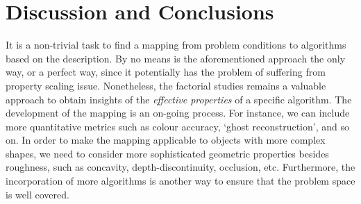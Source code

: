 \section{Discussion and Conclusions}
It is a non-trivial task to find a mapping from problem conditions to algorithms based on the description. By no means is the aforementioned approach the only way, or a perfect way, since it potentially has the problem of suffering from property scaling issue. Nonetheless, the factorial studies remains a valuable approach to obtain insights of the \textit{effective properties} of a specific algorithm. The development of the mapping is an on-going process. For instance, we can include more quantitative metrics such as colour accuracy, `ghost reconstruction', and so on. In order to make the mapping applicable to objects with more complex shapes, we need to consider more sophisticated geometric properties besides roughness, such as concavity, depth-discontinuity, occlusion, etc. Furthermore, the incorporation of more algorithms is another way to ensure that the problem space is well covered.
